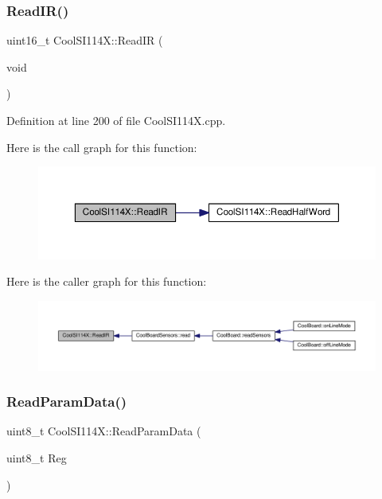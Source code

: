 \subsubsection{\texorpdfstring{Read\+I\+R()}{ReadIR()}}
{\footnotesize\ttfamily uint16\+\_\+t Cool\+S\+I114\+X\+::\+Read\+IR (\begin{DoxyParamCaption}\item[{void}]{ }\end{DoxyParamCaption})}



Definition at line 200 of file Cool\+S\+I114\+X.\+cpp.

Here is the call graph for this function\+:
\nopagebreak
\begin{figure}[H]
\begin{center}
\leavevmode
\includegraphics[width=350pt]{class_cool_s_i114_x_abc536ee7ae8e3ba9d1069acc3889a2cf_cgraph}
\end{center}
\end{figure}
Here is the caller graph for this function\+:
\nopagebreak
\begin{figure}[H]
\begin{center}
\leavevmode
\includegraphics[width=350pt]{class_cool_s_i114_x_abc536ee7ae8e3ba9d1069acc3889a2cf_icgraph}
\end{center}
\end{figure}
\mbox{\label{class_cool_s_i114_x_a33cf431103c722442f6a0cc93848d640}} 
\subsubsection{\texorpdfstring{Read\+Param\+Data()}{ReadParamData()}}
{\footnotesize\ttfamily uint8\+\_\+t Cool\+S\+I114\+X\+::\+Read\+Param\+Data (\begin{DoxyParamCaption}\item[{uint8\+\_\+t}]{Reg }\end{DoxyParamCaption})}




